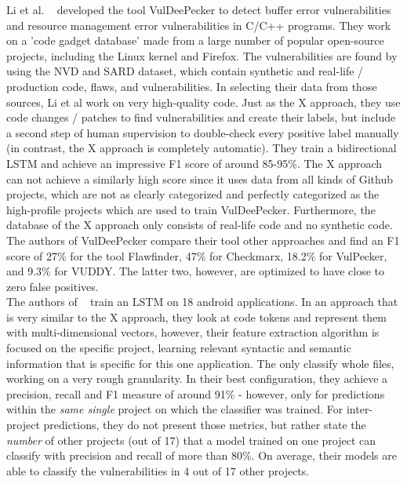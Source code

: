 \documentclass[
	a4paper,
	pagesize,
	pdftex,
	12pt,
	twoside, %
	BCOR=5mm, %
	ngerman,
	fleqn,
	final,
	]{scrartcl}
\begin{document}
Li et al. ~\cite{Li.2018} developed the tool VulDeePecker to detect buffer error vulnerabilities and resource management error vulnerabilities in C/C++ programs. They work on a 'code gadget database' made from a large number of popular open-source projects, including the Linux kernel and Firefox. The vulnerabilities are found by using the NVD and SARD dataset, which contain synthetic and real-life / production code, flaws, and vulnerabilities. In selecting their data from those sources, Li et al work on very high-quality code. Just as the X approach, they use code changes / patches to find vulnerabilities and create their labels, but include a second step of human supervision to double-check every positive label manually (in contrast, the X approach is completely automatic). They train a bidirectional LSTM and achieve an impressive F1 score of around 85-95\%. The X approach can not achieve a similarly high score since it uses data from all kinds of Github projects, which are not as clearly categorized and perfectly categorized as the high-profile projects which are used to train VulDeePecker. Furthermore, the database of the X approach only consists of real-life code and no synthetic code.\\

The authors of VulDeePecker compare their tool other approaches and find an F1 score of 27\% for the tool Flawfinder, 47\% for Checkmarx, 18.2\% for VulPecker, and 9.3\% for VUDDY. The latter two, however, are optimized to have close to zero false positives.\\

The authors of ~\cite{Dam.2017} train an LSTM on 18 android applications. In an approach that is very similar to the X approach, they look at code tokens and represent them with multi-dimensional vectors, however, their feature extraction algorithm is focused on the specific project, learning relevant syntactic and semantic information that is specific for this one application. The only classify whole files, working on a very rough granularity. In their best configuration, they achieve a precision, recall and F1 measure of around 91\% - however, only for predictions within the \textit{same single} project on which the classifier was trained. For inter-project predictions, they do not present those metrics, but rather state the \textit{number} of other projects (out of 17) that a model trained on one project can classify with precision and recall of more than 80\%. On average, their models are able to classify the vulnerabilities in 4 out of 17 other projects.\\
\end{document}
